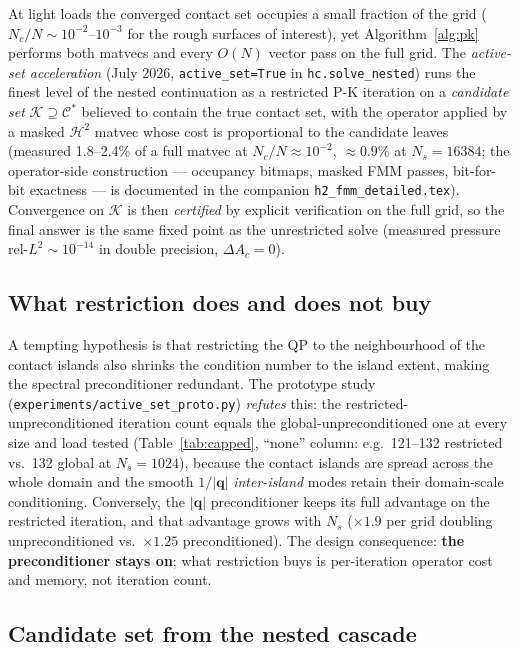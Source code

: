 \documentclass[11pt,a4paper]{article}
\newcommand{\calC}{\mathcal{C}}
\begin{document}
At light loads the converged contact set occupies a small fraction of the
grid ($N_c/N \sim 10^{-2}$--$10^{-3}$ for the rough surfaces of interest),
yet Algorithm~\ref{alg:pk} performs both matvecs and every $O(N)$ vector pass
on the full grid.  The \emph{active-set acceleration} (July 2026,
\texttt{active\_set=True} in \texttt{hc.solve\_nested}) runs the finest level
of the nested continuation as a restricted P-K iteration on a
\emph{candidate set} $\mathcal{K} \supseteq \calC^*$ believed to contain the
true contact set, with the operator applied by a masked $\mathcal{H}^2$
matvec whose cost is proportional to the candidate leaves (measured
1.8--2.4\% of a full matvec at $N_c/N \approx 10^{-2}$, $\approx\!0.9\%$ at
$N_s = 16384$; the operator-side construction --- occupancy bitmaps, masked
FMM passes, bit-for-bit exactness --- is documented in the companion
\texttt{h2\_fmm\_detailed.tex}).  Convergence on $\mathcal{K}$ is then
\emph{certified} by explicit verification on the full grid, so the final
answer is the same fixed point as the unrestricted solve (measured pressure
rel-$L^2 \sim 10^{-14}$ in double precision, $\Delta A_c = 0$).

\subsection{What restriction does and does not buy}
\label{sec:active-cond}

A tempting hypothesis is that restricting the QP to the neighbourhood of the
contact islands also shrinks the condition number to the island extent,
making the spectral preconditioner redundant.  The prototype study
(\texttt{experiments/active\_set\_proto.py}) \emph{refutes} this: the
restricted-unpreconditioned iteration count equals the
global-unpreconditioned one at every size and load tested
(Table~\ref{tab:capped}, ``none'' column: e.g.\ 121--132 restricted vs.\ 132
global at $N_s = 1024$), because the contact islands are spread across the
whole domain and the smooth $1/|\mathbf q|$ \emph{inter-island} modes retain
their domain-scale conditioning.  Conversely, the $|\mathbf q|$
preconditioner keeps its full advantage on the restricted iteration, and
that advantage grows with $N_s$ ($\times1.9$ per grid doubling
unpreconditioned vs.\ $\times1.25$ preconditioned).  The design consequence:
\textbf{the preconditioner stays on}; what restriction buys is per-iteration
operator cost and memory, not iteration count.

\subsection{Candidate set from the nested cascade}
\label{sec:active-cand}
\end{document}
